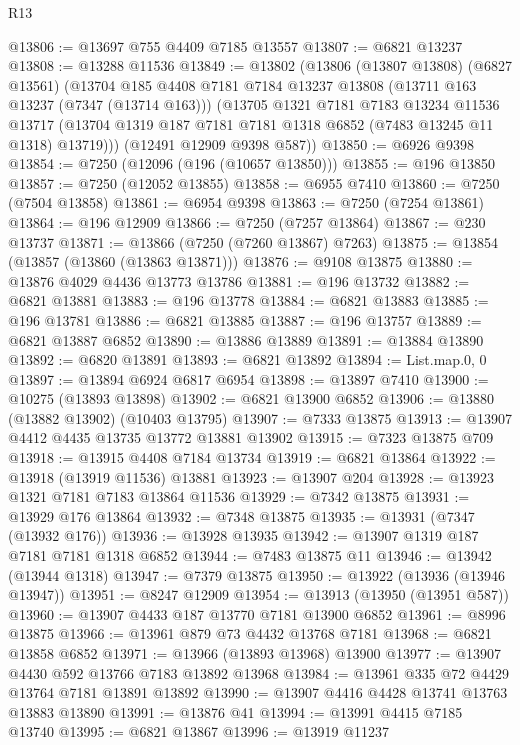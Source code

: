 \begin{lexlean}{R13}
\begin{coremodule}
@13806 := @13697 @755 @4409 @7185 @13557
@13807 := @6821 @13237
@13808 := @13288 @11536
@13849 := @13802
    (@13806
      (@13807 @13808)
      (@6827 @13561)
      (@13704
        @185
        @4408
        @7181
        @7184
        @13237
        @13808
        (@13711 @163 @13237 (@7347 (@13714 @163)))
        (@13705
          @1321
          @7181
          @7183
          @13234
          @11536
          @13717
          (@13704 @1319 @187 @7181 @7181 @1318 @6852 (@7483 @13245 @11 @1318) @13719)))
      (@12491 @12909 @9398 @587))
@13850 := @6926 @9398
@13854 := @7250 (@12096 (@196 (@10657 @13850)))
@13855 := @196 @13850
@13857 := @7250 (@12052 @13855)
@13858 := @6955 @7410
@13860 := @7250 (@7504 @13858)
@13861 := @6954 @9398
@13863 := @7250 (@7254 @13861)
@13864 := @196 @12909
@13866 := @7250 (@7257 @13864)
@13867 := @230 @13737
@13871 := @13866 (@7250 (@7260 @13867) @7263)
@13875 := @13854 (@13857 (@13860 (@13863 @13871)))
@13876 := @9108 @13875
@13880 := @13876 @4029 @4436 @13773 @13786
@13881 := @196 @13732
@13882 := @6821 @13881
@13883 := @196 @13778
@13884 := @6821 @13883
@13885 := @196 @13781
@13886 := @6821 @13885
@13887 := @196 @13757
@13889 := @6821 @13887 @6852
@13890 := @13886 @13889
@13891 := @13884 @13890
@13892 := @6820 @13891
@13893 := @6821 @13892
@13894 := List.map.{0, 0}
@13897 := @13894 @6924 @6817 @6954
@13898 := @13897 @7410
@13900 := @10275 (@13893 @13898)
@13902 := @6821 @13900 @6852
@13906 := @13880 (@13882 @13902) (@10403 @13795)
@13907 := @7333 @13875
@13913 := @13907 @4412 @4435 @13735 @13772 @13881 @13902
@13915 := @7323 @13875 @709
@13918 := @13915 @4408 @7184 @13734
@13919 := @6821 @13864
@13922 := @13918 (@13919 @11536) @13881
@13923 := @13907 @204
@13928 := @13923 @1321 @7181 @7183 @13864 @11536
@13929 := @7342 @13875
@13931 := @13929 @176 @13864
@13932 := @7348 @13875
@13935 := @13931 (@7347 (@13932 @176))
@13936 := @13928 @13935
@13942 := @13907 @1319 @187 @7181 @7181 @1318 @6852
@13944 := @7483 @13875 @11
@13946 := @13942 (@13944 @1318)
@13947 := @7379 @13875
@13950 := @13922 (@13936 (@13946 @13947))
@13951 := @8247 @12909
@13954 := @13913 (@13950 (@13951 @587))
@13960 := @13907 @4433 @187 @13770 @7181 @13900 @6852
@13961 := @8996 @13875
@13966 := @13961 @879 @73 @4432 @13768 @7181
@13968 := @6821 @13858 @6852
@13971 := @13966 (@13893 @13968) @13900
@13977 := @13907 @4430 @592 @13766 @7183 @13892 @13968
@13984 := @13961 @335 @72 @4429 @13764 @7181 @13891 @13892
@13990 := @13907 @4416 @4428 @13741 @13763 @13883 @13890
@13991 := @13876 @41
@13994 := @13991 @4415 @7185 @13740
@13995 := @6821 @13867
@13996 := @13919 @11237

\end{coremodule}
\end{lexlean}
